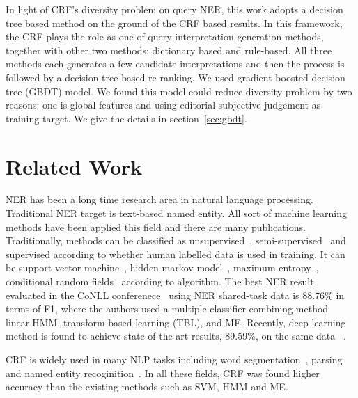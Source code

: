\documentclass[11pt]{article}
\begin{document}
In light of CRF's diversity problem on query NER, this work adopts a decision tree based method on the ground of the CRF based results. In this framework, the CRF plays the role as one of query interpretation generation methods, together with other two methods: dictionary based and rule-based. All three methods each generates a few candidate interpretations and then the process is followed by a decision tree based re-ranking. We used gradient boosted decision tree (GBDT)\cite{Friedman:2002,Ye:2009}  model. We found this model could reduce diversity problem by two reasons: one is global features and using editorial subjective judgement as training target. We give the details in section~\ref{sec:gbdt}.












\section{Related Work}
NER has been a long time research area in natural language processing. Traditional NER target is text-based  named entity. All sort of machine learning methods have been applied this field and  there are many publications. Traditionally, methods can be classified as unsupervised~\cite{Collins:1999,Etzioni:2005:UNE:1090483.1090487}, semi-supervised~\cite{Riloff:1999:LDI:315149.315364,Ji:2006:DSS:1641408.1641414} and supervised according to whether human labelled data is used in training. It can be support vector machine~\cite{Asahara:2003:JNE:1073445.1073447}, hidden markov model~\cite{Shen:NER}, maximum entropy~\cite{Chieu:2003:NER:1119176.1119199}, conditional random fields~\cite{McCallum:2003:ERN:1119176.1119206}  according to algorithm. The best NER result evaluated in the CoNLL  conferenece~\cite{TjongKimSang:2003:ICS:1119176.1119195} using NER shared-task data is 88.76\% in terms of F1, where the authors used a multiple classifier combining method linear,HMM, transform based learning (TBL), and ME. 
Recently, deep learning method is found to achieve state-of-the-art results, 89.59\%, on the same data~\cite{collobert:2011b} .

CRF is widely used in many NLP tasks including word segmentation~\cite{Xue:2003:CWS:1119250.1119278}, parsing~\cite{Sha:2003:SPC:1073445.1073473} and named entity recoginition~\cite{McCallum:2003:ERN:1119176.1119206}. In all these fields, CRF was found higher accuracy than the existing methods such as SVM, HMM and ME.
\end{document}
